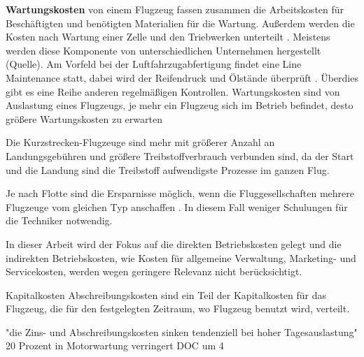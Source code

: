 \textbf{Wartungskosten} von einem Flugzeug fassen zusammen die Arbeitskosten für Beschäftigten und benötigten Materialien für die Wartung.
Außerdem werden die Kosten nach Wartung einer Zelle und den Triebwerken unterteilt \cite{wang2021research}. 
Meistens werden diese Komponente von unterschiedlichen
Unternehmen hergestellt (Quelle).
Am Vorfeld bei der Luftfahrzugabfertigung findet eine Line Maintenance statt, dabei wird der Reifendruck und Ölstände überprüft \cite{conrady2019luftverkehr}. 
Überdies gibt es eine Reihe anderen regelmäßigen Kontrollen.
Wartungskosten sind von Auslastung eines Flugzeugs, je mehr ein Flugzeug sich im Betrieb befindet, desto größere
Wartungskosten zu erwarten %

Die Kurzstrecken-Flugzeuge sind mehr mit größerer Anzahl an Landungsgebühren und größere Treibstoffverbrauch verbunden sind, da 
der Start und die Landung sind die Treibstoff aufwendigste Prozesse im ganzen Flug.

Je nach Flotte sind die Ersparnisse möglich, wenn die Fluggesellschaften mehrere Flugzeuge vom gleichen Typ anschaffen \cite{conrady2019luftverkehr}. 
In diesem Fall weniger Schulungen für die Techniker notwendig.


In dieser Arbeit wird der Fokus auf die direkten Betriebskosten gelegt und die indirekten Betriebskosten, wie Kosten für 
allgemeine Verwaltung, Marketing- und Servicekosten, werden wegen geringere Relevanz nicht berücksichtigt.



Kapitalkosten
Abschreibungskosten sind ein Teil der Kapitalkosten für das Flugzeug, die für den festgelegten Zeitraum, wo Flugzeug benutzt wird, verteilt.



"die Zins- und Abschreibungskosten sinken tendenziell bei hoher Tagesauslastung"
20 Prozent in Motorwartung verringert DOC um 4%


